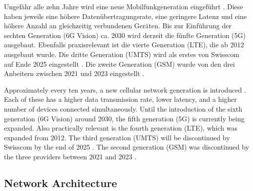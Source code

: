 \begin{German}
    Ungefähr alle zehn Jahre wird eine neue Mobilfunkgeneration eingeführt \cite{bundesratNachhaltigesMobilfunknetzBericht2022}. Diese haben jeweils eine höhere Datenübertragungsrate, eine geringere Latenz und eine höhere Anzahl an gleichzeitig verbundenen Geräten. Bis zur Einführung der sechten Generation (6G Vision) ca. 2030 wird derzeit die fünfte Generation (5G) ausgebaut. Ebenfalls praxisrelevant ist die vierte Generation (LTE), die ab 2012 ausgebaut wurde. Die dritte Generation (UMTS) wird als erstes von Swisscom auf Ende 2025 eingestellt \cite{swisscomAbschaltung3GErneuerung}. Die zweite Generation (GSM) wurde von den drei Anbeitern zwischen 2021 und 2023 eingestellt \cite{onlineSchweizEndgueltigesAus2022}.
\end{German}

\begin{English}
    Approximately every ten years, a new cellular network generation is introduced \cite{bundesratNachhaltigesMobilfunknetzBericht2022}. Each of these has a higher data transmission rate, lower latency, and a higher number of devices connected simultaneously. Until the introduction of the sixth generation (6G Vision) around 2030, the fifth generation (5G) is currently being expanded. Also practically relevant is the fourth generation (LTE), which was expanded from 2012. The third generation (UMTS) will be discontinued by Swisscom by the end of 2025 \cite{swisscomAbschaltung3GErneuerung}. The second generation (GSM) was discontinued by the three providers between 2021 and 2023 \cite{onlineSchweizEndgueltigesAus2022}.
\end{English}

\subsection{Network Architecture}


